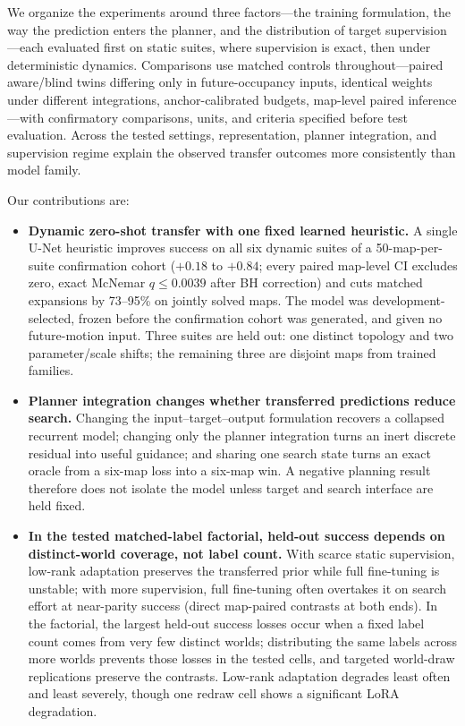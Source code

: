 \documentclass[letterpaper]{article} %
\begin{document}
We organize the experiments around three factors---the training formulation, the way the prediction enters the planner, and the distribution of target supervision---each evaluated first on static suites, where supervision is exact, then under deterministic dynamics. Comparisons use matched controls throughout---paired aware/blind twins differing only in future-occupancy inputs, identical weights under different integrations, anchor-calibrated budgets, map-level paired inference \citep{henderson2018matters,agarwal2021precipice,pineau2021reproducibility}---with confirmatory comparisons, units, and criteria specified before test evaluation. Across the tested settings, representation, planner integration, and supervision regime explain the observed transfer outcomes more consistently than model family.

Our contributions are:
\begin{itemize}
    \item \textbf{Dynamic zero-shot transfer with one fixed learned heuristic.} A single U-Net heuristic improves success on all six dynamic suites of a 50-map-per-suite confirmation cohort ($+0.18$ to $+0.84$; every paired map-level CI excludes zero, exact McNemar $q \leq 0.0039$ after BH correction) and cuts matched expansions by 73--95\% on jointly solved maps. The model was development-selected, frozen before the confirmation cohort was generated, and given no future-motion input. Three suites are held out: one distinct topology and two parameter/scale shifts; the remaining three are disjoint maps from trained families.
    \item \textbf{Planner integration changes whether transferred predictions reduce search.} Changing the input--target--output formulation recovers a collapsed recurrent model; changing only the planner integration turns an inert discrete residual into useful guidance; and sharing one search state turns an exact oracle from a six-map loss into a six-map win. A negative planning result therefore does not isolate the model unless target and search interface are held fixed.
    \item \textbf{In the tested matched-label factorial, held-out success depends on distinct-world coverage, not label count.} With scarce static supervision, low-rank adaptation preserves the transferred prior while full fine-tuning is unstable; with more supervision, full fine-tuning often overtakes it on search effort at near-parity success (direct map-paired contrasts at both ends). In the factorial, the largest held-out success losses occur when a fixed label count comes from very few distinct worlds; distributing the same labels across more worlds prevents those losses in the tested cells, and targeted world-draw replications preserve the contrasts. Low-rank adaptation degrades least often and least severely, though one redraw cell shows a significant LoRA degradation.
\end{itemize}
\end{document}
